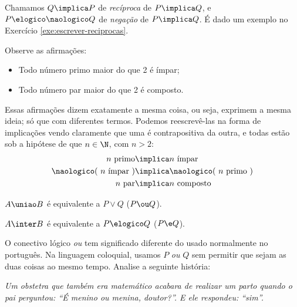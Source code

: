Chamamos $Q \implica P$ de \emph{recíproca} de $P \implica Q$, e $P \elogico \naologico Q$ de \emph{negação} de $P \implica Q$. É dado um exemplo no Exercício \ref{exe:escrever-reciprocas}.

\begin{example}
	Observe as afirmações:
	
	\begin{itemize}
		\item Todo número primo maior do que 2 é ímpar;
		\item Todo número par maior do que 2 é composto.
	\end{itemize}

	Essas afirmações dizem exatamente a mesma coisa, ou seja, exprimem a mesma ideia; só que com diferentes termos. Podemos reescrevê-las na forma de implicações vendo claramente que uma é contrapositiva da outra, e todas estão sob a hipótese de que $n \in \N$, com $n > 2$:    
    \begin{align*}
        \text{$n$ primo}                   &\implica \text{$n$ ímpar} \\
        \text{$\naologico$( $n$ ímpar )}   &\implica \text{$\naologico$( $n$ primo )} \\
        \text{$n$ par}                     &\implica \text{$n$ composto}
    \end{align*}
\end{example}

\begin{proposition}
	$A \uniao B$ é equivalente a $P \lor Q$ ($P \ou Q$).
\end{proposition}

\begin{proposition}
	$A \inter B$ é equivalente a $P \elogico Q$ ($P \e Q$).
\end{proposition}

\begin{remark}
    O conectivo lógico \textit{ou} tem significado diferente do usado normalmente no português. Na linguagem coloquial, usamos $P$ \textit{ou} $Q$ sem permitir que sejam as duas coisas ao mesmo tempo. Analise a seguinte história:

    \emph{Um obstetra que também era matemático acabara de realizar um parto quando o pai perguntou: ``É menino ou menina, doutor?''. E ele respondeu: ``sim''.}
\end{remark}


